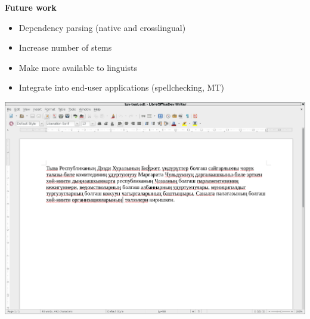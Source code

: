 \documentclass[fontscale=0.35,landscape,paperwidth=841mm,paperheight=1189mm]{baposter}  %
\newcommand{\htwo}[1]{{\htwofont \textbf{\dotfill{}#1\dotfill{}}}}
\begin{document}
\begin{poster}
{				%
			\htwo{Future work}
				\begin{itemize}
					\item Dependency parsing (native and crosslingual)
					\item Increase number of stems
					\item Make more available to linguists
					\item Integrate into end-user applications (spellchecking, MT)
				\end{itemize}
				\includegraphics[width=\textwidth]{img/tyv-spelling}
		}


\end{poster}
\end{document}
